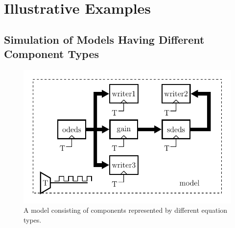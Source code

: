 \section{Illustrative Examples}

\subsection{Simulation of Models Having Different Component Types}
\begin{figure}
    \centering
    \includegraphics[width=\linewidth]{figures/CoupledChuaModel/coupled_chua_model.pdf}
    \caption{A model consisting of components represented by different equation types.}
    \label{fig: coupled model}
\end{figure}

